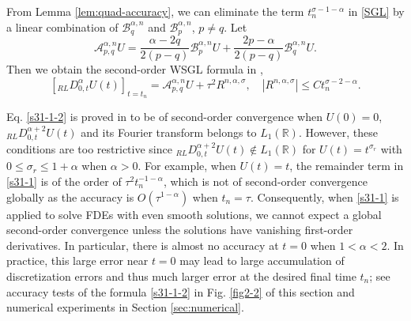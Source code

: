 \documentclass[10pt]{siamltex}
\begin{document}
From Lemma \ref{lem:quad-accuracy},    we can eliminate the
term $t_{n}^{\sigma-1-\alpha}$ in \eqref{SGL} by a linear combination of
$\mathcal{B}_q^{\alpha,n}$ and $\mathcal{B}_p^{\alpha,n}$, $p\neq q$. Let
\begin{equation}\label{s31-1-2}
\mathcal{A}_{p,q}^{\alpha,n}U
=\frac{\alpha-2q}{2(p-q)}\mathcal{B}^{\alpha,n}_{p}U
+\frac{2p-\alpha}{2(p-q)}\mathcal{B}^{\alpha,n}_{q}U.
\end{equation}
Then  we obtain   the second-order WSGL formula in \cite{TianZD14},
\begin{equation}\label{s31-1} %
\left[{}_{RL}D_{0,t}^{\alpha}U(t)\right]_{t=t_n}=\mathcal{A}_{p,q}^{\alpha,n}U
+\tau^{2}R^{n,\alpha,\sigma}, \quad |R^{n,\alpha,\sigma}|\leq C t_n^{\sigma-2-\alpha}.
\end{equation}




Eq. \eqref{s31-1-2} is   proved in \cite{TianZD14,WangVong14b} to be of second-order convergence when
$U(0)=0$, ${}_{RL}D_{0,t}^{\alpha+2}U(t)$ and its Fourier transform belongs to  $L_1(\mathbb{R})$.
However,   these conditions are too restrictive since ${}_{RL}D_{0,t}^{\alpha+2}U(t)\notin L_1(\mathbb{R})$
for  $U(t)=t^{\sigma_r}$ with $0\leq \sigma_r\leq 1+\alpha$ when  $\alpha>0$. For example, when  $U(t)=t$, the remainder term in \eqref{s31-1}
is of the order of $\tau^2t_{n}^{-1-\alpha}$, which is  not
of second-order convergence globally as the accuracy is $O(\tau^{1-\alpha})$
when $t_n=\tau$.
Consequently, when \eqref{s31-1} is applied to solve FDEs with even smooth solutions,
we cannot  expect
a global second-order convergence unless   {the solutions
have  vanishing first-order derivatives}.
In particular,  there is almost no accuracy  at $t=0$ when  $1<\alpha<2$.
In practice, this large error near $t=0$ may lead to large accumulation of discretization errors and thus much larger error at the desired final time $t_n$; see  accuracy  tests of the formula \eqref{s31-1-2}
in Fig. \ref{fig2-2} of this section and numerical experiments
in Section \ref{sec:numerical}.
\end{document}
